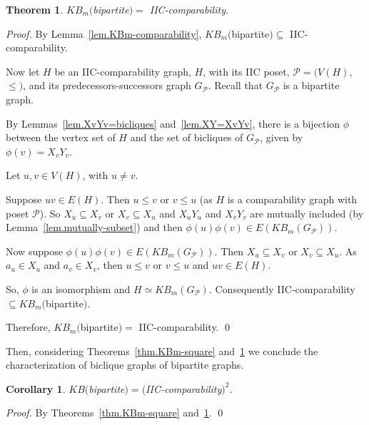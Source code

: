 \documentclass{article}
\newcommand{\margem}[2]
        {\mbox{}\marginpar{%
        \raggedright\textcolor{#2}{%
        \hspace{0pt}\bfseries\ssmall #1\\}}}
\newcommand{\comment}[3]{\margem{\textit{(#1)}\\ #3}{#2}}
\newcommand{\mP}{\ensuremath{\mathcal{P}}}
\newtheorem{theorem}{Theorem}
\newtheorem{corollary}{Corollary}
\begin{document}
\begin{theorem}\label{thm.KBmBipartite}
  $KB_m($bipartite$) = $ IIC-comparability.
\end{theorem}
\begin{proof}
  By Lemma~\ref{lem.KBm-comparability}, $KB_m($bipartite$) \subseteq $
  IIC-comparability.

  Now let  $H$ be an IIC-comparability  graph, $H$, with its  IIC poset,
  $\mP  =   (V(H)$,  $\leq)$,  and  its   predecessors-successors  graph
  $G_{\mP}$. Recall that $G_{\mP}$ is a bipartite graph.

  By Lemmas~\ref{lem.XvYv=bicliques}  and~\ref{lem.XY=XvYv}, there  is a
  bijection  $\phi$  between the  vertex  set  of  $H$  and the  set  of
  bicliques of $G_{\mP}$, given by $\phi(v) = X_vY_v$.

  Let $u, v \in V(H)$, with $u \neq v$.

  Suppose $uv \in E(H)$. Then $u \leq v$ or $v \leq u$ (as $H$ is a
  comparability  graph with  poset $\mP$).   So $X_u  \subseteq X_v$  or
  $X_v \subseteq  X_u$ and $X_uY_u$  and $X_vY_v$ are  mutually included
  (by         Lemma~\ref{lem.mutually-subset})          and         then
  $\phi(u)\phi(v) \in E(KB_m(G_{\mP}))$.

  Now   suppose    $\phi(u)\phi(v)   \in    E(KB_m(G_{\mP}))$.   Then
  $X_u  \subseteq X_v$  or $X_v  \subseteq X_u$.  As $a_u  \in X_u$  and
  $a_v \in X_v$, then $u \leq v$ or $v \leq u$ and $uv \in E(H)$.

  So,     $\phi$     is     an     isomorphism     and     $H     \simeq
  KB_m(G_{\mP})$. Consequently IIC-com\-pa\-ra\-bi\-li\-ty $\subseteq KB_m($bipartite$)$.

  Therefore, $KB_m($bipartite$) = $ IIC-comparability.
  \qed
\end{proof}

Then,              considering             Theorems~\ref{thm.KBm-square}
and~\ref{thm.KBmBipartite} we conclude  the characterization of biclique
graphs of bipartite graphs.

\begin{corollary}\label{cor.Snstar}
  $KB($bipartite$) = ($IIC-comparability$)^2$.
\end{corollary}
\begin{proof}
  By Theorems~\ref{thm.KBm-square} and~\ref{thm.KBmBipartite}.
  \qed
\end{proof}
\end{document}
